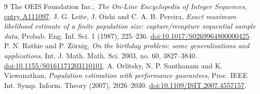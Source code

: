 \documentclass[11pt,letterpaper]{article}
\begin{document}
\begin{thebibliography}{9}
 The OEIS Foundation Inc., \emph{The On-Line Encyclopedia of Integer Sequences},
\href{https://oeis.org/A111097}{entry A111097}.
 J. G. Leite, J. Oishi and C. A. B. Pereira,
\emph{Exact maximum likelihood estimate of a finite population size:
capture/recapture sequential sample data}, Probab. Eng. Inf. Sci. 1 (1987),
225--236. \href{https://doi.org/10.1017/S0269964800000425}{doi:10.1017/S0269964800000425}.
 P. N. Rathie and P. Z\"ornig,
\emph{On the birthday problem: some generalizations and applications},
Int. J. Math. Math. Sci. 2003, no. 60, 3827--3840.
\href{https://doi.org/10.1155/S0161171203110101}{doi:10.1155/S0161171203110101}.
 A. Orlitsky, N. P. Santhanam and K. Viswanathan,
\emph{Population estimation with performance guarantees},
Proc. IEEE Int. Symp. Inform. Theory (2007), 2026--2030.
\href{https://doi.org/10.1109/ISIT.2007.4557157}{doi:10.1109/ISIT.2007.4557157}.
\end{thebibliography}
\end{document}
